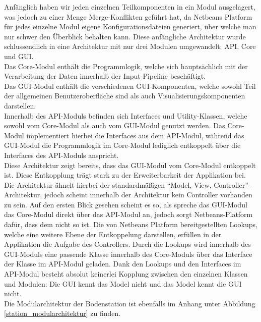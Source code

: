 Anfänglich haben wir jeden einzelnen Teilkomponenten in ein Modul ausgelagert, was jedoch zu einer Menge Merge-Konflikten geführt hat, da Netbeans Platform für jedes einzelne Modul eigene Konfigurationsdateien generiert, über welche man nur schwer den Überblick behalten kann. Diese anfängliche Architektur wurde schlussendlich in eine Architektur mit nur drei Modulen umgewandelt: API, Core und GUI. \\
Das Core-Modul enthält die Programmlogik, welche sich hauptsächlich mit der Verarbeitung der Daten innerhalb der Input-Pipeline beschäftigt. \\
Das GUI-Modul enthält die verschiedenen GUI-Komponenten, welche sowohl Teil der allgemeinen Benutzeroberfläche sind als auch Visualisierungskomponenten darstellen. \\
Innerhalb des API-Moduls befinden sich Interfaces und Utility-Klassen, welche sowohl vom Core-Modul als auch vom GUI-Modul genutzt werden. Das Core-Modul implementiert hierbei die Interfaces aus dem API-Modul, während das GUI-Modul die Programmlogik im Core-Modul lediglich entkoppelt über die Interfaces des API-Moduls anspricht. \\
Diese Architektur zeigt bereits, dass das GUI-Modul vom Core-Modul entkoppelt ist. Diese Entkopplung trägt stark zu der Erweiterbarkeit der Applikation bei. Die Architektur ähnelt hierbei der standardmäßigen ``Model, View, Controller''-Architektur, jedoch scheint innerhalb der Architektur kein Controller vorhanden zu sein. Auf den ersten Blick gesehen scheint es so, als spreche das GUI-Modul das Core-Modul direkt über das API-Modul an, jedoch sorgt Netbeans-Platform dafür, dass dem nicht so ist. Die von Netbeans Platform bereitgestellten Lookups, welche eine weitere Ebene der Entkoppelung darstellen, erfüllen in der Applikation die Aufgabe des Controllers. Durch die Lookups wird innerhalb des GUI-Moduls eine passende Klasse innerhalb des Core-Moduls über das Interface der Klasse im API-Modul geladen. Dank den Lookups und den Interfaces im API-Modul besteht absolut keinerlei Kopplung zwischen den einzelnen Klassen und Modulen: Die GUI kennt das Model nicht und das Model kennt die GUI nicht. \\
Die Modularchitektur der Bodenstation ist ebenfalls im Anhang unter Abbildung \ref{station_modularchitektur} zu finden.

